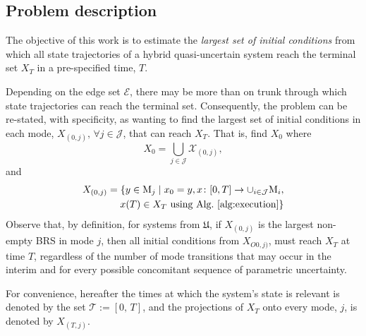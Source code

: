 \subsection{Problem description}
The objective of this work is to estimate the {\em largest set of initial conditions} from which all state trajectories of a hybrid quasi-uncertain system reach the terminal set $X_T$ in a pre-specified time, $T$.
\par
Depending on the edge set $\mathcal E$, there may be more than on trunk through which state trajectories can reach the terminal set. Consequently, the problem can be re-stated, with specificity, as wanting to find the largest set of initial conditions in each mode, $X_{(0,j)},\,\forall j\in \mathcal J$, that can reach $X_T$. That is, find $X_0$ where
$$X_0=\bigcup_{j\in \mathcal J} \mathcal X_{(0,j)},$$
and
\begin{align*}
\begin{aligned}
     X_{(0,j)}=\{y\in \mathrm M_j\mid x_0=y, x\colon [0,T]\rightarrow \cup_{i\in \mathcal J} \mathrm{M}_i,\\\,x(T)\in X_T \text{ using Alg.~\ref{alg:execution}}\}
\end{aligned}
\end{align*}
Observe that, by definition, for systems from $\mathfrak{U}$, if $X_{(0,j)}$ is the largest non-empty BRS in mode $j$, then all initial conditions from $X_{O0,j)}$, must reach $X_T$ at time $T$, regardless of the number of mode transitions that may occur in the interim and for every possible concomitant sequence of parametric uncertainty.
\par
For convenience, hereafter the times at which the system's state is relevant is denoted by the set $\mathcal T:=[0,\,T]$, and the projections of $X_T$ onto every mode, $j$, is denoted by $X_{(T,j)}$.
